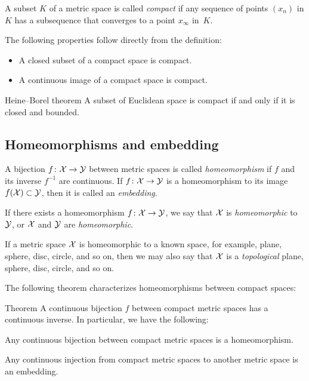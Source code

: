 A subset $K$ of a metric space is called \emph{compact} if any sequence of points $(x_n)$ in $K$ has a subsequence that converges to a point $x_\infty$ in~$K$.

The following properties follow directly from the definition:

\begin{itemize}
\item A closed subset of a compact space is compact.
\item A continuous image of a compact space is compact.
\end{itemize}

\begin{thm}{Heine--Borel theorem}\label{thm:Heine--Borel}
A subset of Euclidean space is compact if and only if it is closed and bounded.
\end{thm}


\subsection*{Homeomorphisms and embedding}

A bijection $f\colon\mathcal{X}\to\mathcal{Y}$ between metric spaces is called \emph{homeomorphism} if $f$ and its inverse $f^{-1}$ are continuous.
If $f\colon\mathcal{X}\to\mathcal{Y}$ is a homeomorphism to its image $f(\mathcal{X})\subset \mathcal{Y}$, then it is called an \emph{embedding}.

If there exists a homeomorphism $f\colon\mathcal{X}\to \mathcal{Y}$,
we say that ${\mathcal{X}}$ is {}\emph{homeomorphic} to $\mathcal{Y}$,
or $\mathcal{X}$ and $\mathcal{Y}$ are {}\emph{homeomorphic}.

If a metric space $\mathcal{X}$ is homeomorphic to a known space, for example, plane, sphere, disc, circle, and so on,
then we may also say that $\mathcal{X}$ is a \emph{topological} plane, sphere, disc, circle, and so on.

The following theorem characterizes homeomorphisms between compact spaces:

\begin{thm}{Theorem}\label{thm:Hausdorff-compact}
A continuous bijection $f$ between compact metric spaces has a continuous inverse.
In particular, we have the following:

\begin{subthm}{}
Any continuous bijection between compact metric spaces
is a homeomorphism.
\end{subthm}

\begin{subthm}{}
Any continuous injection from compact metric spaces to another metric space
is an embedding.
\end{subthm}


\end{thm}


